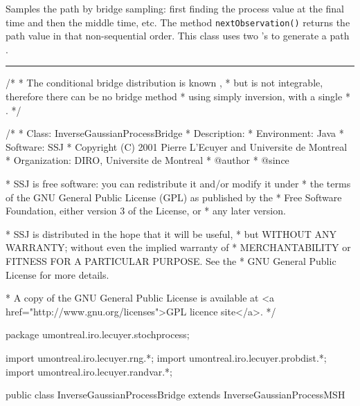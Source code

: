 
Samples the path by bridge sampling: 
first finding the process value at
the final time and then the middle time, etc.
The method \texttt{nextObservation()} returns the path value
in that non-sequential order. 
This class uses two 
's to generate
a path \cite{fWEB03a}.



\bigskip\hrule\bigskip

\begin{code}\begin{hide}
/* 
 * The conditional bridge distribution is known \cite{fWEB03a},
 * but is not integrable, therefore there can be no bridge method
 * using simply inversion, with a single 
 * .
 */

/*
 * Class:        InverseGaussianProcessBridge
 * Description:  
 * Environment:  Java
 * Software:     SSJ 
 * Copyright (C) 2001  Pierre L'Ecuyer and Universite de Montreal
 * Organization: DIRO, Universite de Montreal
 * @author       
 * @since

 * SSJ is free software: you can redistribute it and/or modify it under
 * the terms of the GNU General Public License (GPL) as published by the
 * Free Software Foundation, either version 3 of the License, or
 * any later version.

 * SSJ is distributed in the hope that it will be useful,
 * but WITHOUT ANY WARRANTY; without even the implied warranty of
 * MERCHANTABILITY or FITNESS FOR A PARTICULAR PURPOSE.  See the
 * GNU General Public License for more details.

 * A copy of the GNU General Public License is available at
   <a href="http://www.gnu.org/licenses">GPL licence site</a>.
 */
\end{hide}
package umontreal.iro.lecuyer.stochprocess;\begin{hide}
import umontreal.iro.lecuyer.rng.*;
import umontreal.iro.lecuyer.probdist.*;
import umontreal.iro.lecuyer.randvar.*;

\end{hide}

public class InverseGaussianProcessBridge extends InverseGaussianProcessMSH \begin{hide} {

    // Careful: mu and lambda are completely different from parent class.
    protected double[] imu2;
    protected double[] imuLambdaZ;
    protected double[] imuOver2LambdaZ;

    protected int[] wIndexList;
    protected int   bridgeCounter = -1; // Before 1st observ

\end{hide}
\end{code}
